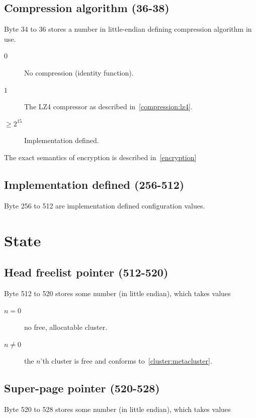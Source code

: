 \documentclass[11pt,a4paper]{report}
\begin{document}
        \subsection{Compression algorithm (36-38)}
        \label{config:compression}
        Byte 34 to 36 stores a number in little-endian defining compression
        algorithm in use.

        \begin{description}
            \item [$0$] No compression (identity function).
            \item [$1$] The LZ4 compressor as
                described
                in~\ref{compression:lz4}.
            \item [$\geq 2^{15}$] Implementation defined.
        \end{description}

        The exact semantics of encryption is described in~\ref{encryption}

        \subsection{Implementation defined (256-512)}
        Byte 256 to 512 are implementation defined configuration values.

    \section{State}
        \subsection{Head freelist pointer (512-520)}
        Byte 512 to 520 stores some number (in little endian), which takes
        values

        \begin{description}
            \item [$n = 0$]    no free, allocatable cluster.
            \item [$n \neq 0$] the $n$'th cluster is free and conforms
                to~\ref{cluster:metacluster}.
        \end{description}

        \subsection{Super-page pointer (520-528)}
        Byte 520 to 528 stores some number (in little endian), which takes
        values
\end{document}
